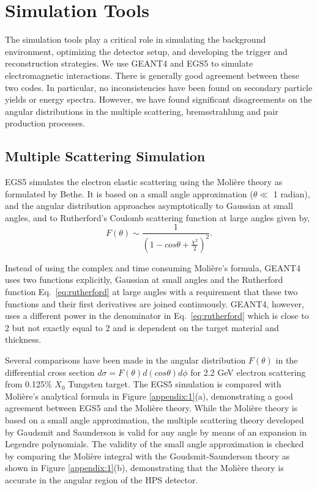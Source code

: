 
\clearpage

\section{Simulation Tools}
\label{app:sim}

The simulation tools play a critical role in simulating the background
environment, optimizing the detector setup, and developing the trigger 
and reconstruction strategies. We use GEANT4 and EGS5 to simulate 
electromagnetic interactions. There is generally good agreement 
between these two codes. In particular, no inconsistencies have been 
found on secondary particle yields or energy spectra. However, we have found 
significant disagreements on the angular distributions in the multiple
scattering, bremsstrahlung and pair production processes.  

\subsection*{Multiple Scattering Simulation}

EGS5 simulates the electron elastic scattering using the Moli\`{e}re theory 
\cite{moliere} as formulated by Bethe. \cite{bethe}
It is based on a small angle approximation
($\theta \ll$ 1 radian), and the angular distribution approaches asymptotically
to Gaussian at small angles, and to Rutherford's Coulomb scattering function at 
large angles given by, 
\begin{equation}
F(\theta) \sim  { \frac{1} {\left(1-cos\theta + {\frac{\chi^2} {2}}\right)^2}}.
\label{eq:rutherford}
\end{equation}

Instead of using the complex and time consuming Moli\`{e}re's formula,
GEANT4 uses two functions explicitly, Gaussian at small angles and the
Rutherford function Eq.~\ref{eq:rutherford} at large angles with a requirement that these two
functions and their first derivatives are joined continuously. 
GEANT4, however, uses a different power
in the denominator in Eq.~\ref{eq:rutherford} which is close to 2 but not exactly equal to 2 and is 
dependent on the target material and thickness.

Several comparisons have been made in the angular distribution $F(\theta)$ in the
differential cross section $d\sigma=F(\theta)d(cos\theta) d\phi$ for 2.2 GeV electron
scattering from 0.125\% $X_0$ Tungsten target. 
The EGS5 simulation is compared with Moli\`{e}re's analytical formula 
in Figure \ref{appendix:1}(a), demonstrating a good agreement between EGS5 and
the Moli\`{e}re theory.
While the Moli\`{e}re theory is based on a small angle approximation,
the multiple scattering theory developed by Gaudsmit and Saunderson is valid 
for any angle by means of an expansion in Legendre polynomials. \cite{gs}
The validity of the small angle approximation is checked by comparing the 
Moli\`{e}re integral with 
the Goudsmit-Saunderson theory as shown in Figure \ref{appendix:1}(b),
demonstrating that the Moli\`{e}re theory is accurate in the angular region
of the HPS detector. 

